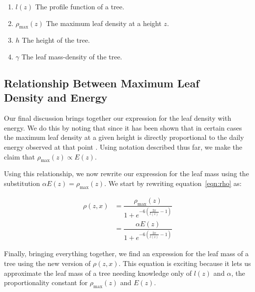 \documentclass[10pt]{article}
\numberwithin{equation}{subsection}
\begin{document}
\begin{enumerate}
\item $l(z)$ The profile function of a tree.
\item $\rho_{\mathrm{max}}(z)$ The maximum leaf density at a height $z$.
\item $h$ The height of the tree.
\item $\gamma$ The leaf mass-density of the tree.
\end{enumerate}


\subsection{Relationship Between Maximum Leaf \\Density and Energy}
Our final discussion brings together our expression for the leaf
density with energy. We do this by noting that since it has been shown
that in certain cases the maximum leaf density at a given height is
directly proportional to the daily energy observed at that point
\citep{sunLeaf01}. Using notation described thus far, we make the
claim that $\rho_{\mathrm{max}}(z) \propto E(z)$.

Using this relationship, we now rewrite our expression for the leaf
mass using the substitution $\alpha E(z) = \rho_{\mathrm{max}}(z)$. We start by rewriting
equation~\eqref{eqn:rho} as:

\begin{center}
  \begin{equation}
    \begin{split}
      \rho(z,x) &= \dfrac{\rho_{\mathrm{max}}(z)}{1+e^{-6(\frac{2x}{l(z)}-1)}} \\
      &= \dfrac{\alpha E(z)}{1+e^{-6(\frac{2x}{l(z)}-1)}}
    \end{split}
  \end{equation}
\end{center}

Finally, bringing everything together, we find an expression for the
leaf mass of a tree using the new version of $\rho(z,x)$. This
equation is exciting because it lets us approximate the leaf mass of a
tree needing knowledge only of $l(z)$ and $\alpha$, the
proportionality constant for $\rho_{\mathrm{max}}(z)$ and $E(z)$.
\end{document}
